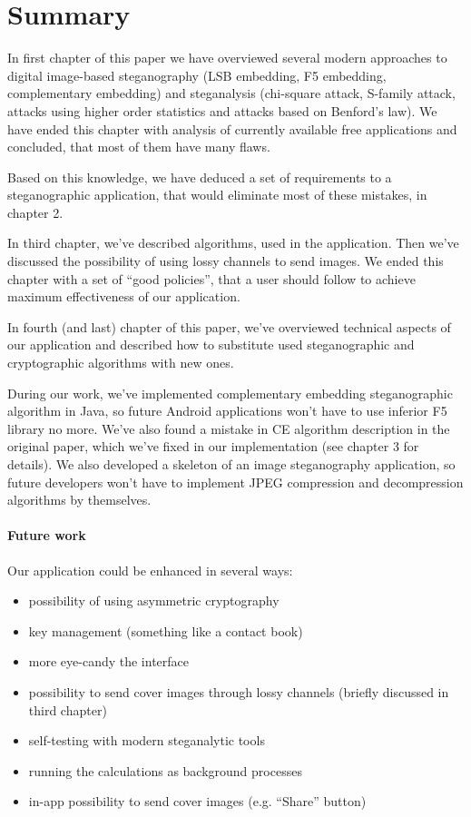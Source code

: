 \chapter*{Summary}

In first chapter of this paper we have overviewed several
modern approaches to digital image-based steganography (LSB embedding, F5 embedding, complementary embedding)
and steganalysis (chi-square attack, S-family attack, attacks using higher order statistics
and attacks based on Benford's law). We have  ended this chapter with analysis of currently available
free applications and concluded, that most of them have many flaws.

Based on this knowledge, we have deduced a set of requirements to a steganographic application, 
that would eliminate most of these mistakes, in chapter 2.

In third chapter, we've described algorithms, used in the application. Then we've discussed
the possibility of using lossy channels to send images. We ended this chapter with a set of
``good policies'', that a user should follow to achieve maximum effectiveness of our application.

In fourth (and last) chapter of this paper, we've overviewed technical aspects of our application and 
described how to substitute used steganographic and cryptographic algorithms with new ones.

During our work, we've implemented complementary embedding steganographic algorithm in Java,
so future Android applications won't have to use inferior F5 library no more. We've also found a mistake in CE algorithm
description in the original paper, which we've fixed in our implementation (see chapter 3 for details).
We also developed a skeleton of an image steganography application, so future developers won't have to
implement JPEG compression and decompression algorithms by themselves.

\subsubsection{Future work}
Our application could be enhanced in several ways:
\begin{itemize}
  \item possibility of using asymmetric cryptography
  \item key management (something like a contact book)
  \item more eye-candy the interface
  \item possibility to send cover images through lossy channels (briefly discussed in third chapter)
  \item self-testing with modern steganalytic tools
  \item running the calculations as background processes
  \item in-app possibility to send cover images (e.g. ``Share'' button)
\end{itemize}
